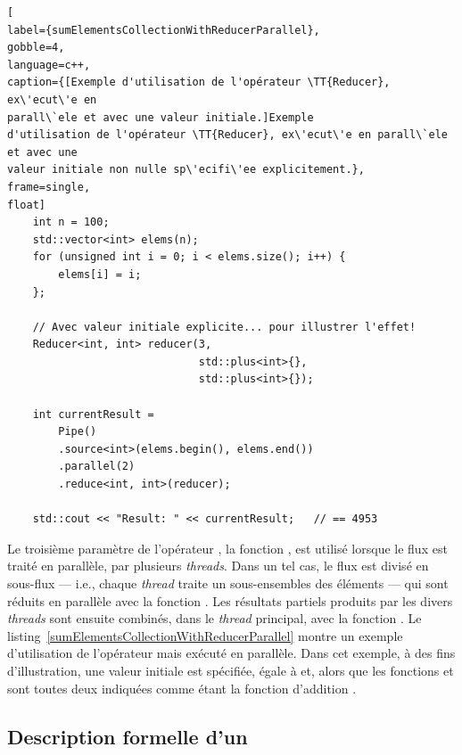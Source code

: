 \begin{lstlisting}[
label={sumElementsCollectionWithReducerParallel},
gobble=4,
language=c++,
caption={[Exemple d'utilisation de l'opérateur \TT{Reducer}, ex\'ecut\'e en
parall\`ele et avec une valeur initiale.]Exemple
d'utilisation de l'opérateur \TT{Reducer}, ex\'ecut\'e en parall\`ele et avec une
valeur initiale non nulle sp\'ecifi\'ee explicitement.},
frame=single,
float]
    int n = 100;
    std::vector<int> elems(n);
    for (unsigned int i = 0; i < elems.size(); i++) {
        elems[i] = i;
    };

    // Avec valeur initiale explicite... pour illustrer l'effet!
    Reducer<int, int> reducer(3, 
                              std::plus<int>{}, 
                              std::plus<int>{});

	int currentResult =
		Pipe()
		.source<int>(elems.begin(), elems.end())
		.parallel(2)
		.reduce<int, int>(reducer); 
	
	std::cout << "Result: " << currentResult;	// == 4953
\end{lstlisting}




Le troisi\`eme param\`etre de l'op\'erateur , la fonction , est utilis\'e lorsque le flux est trait\'e en parall\`ele, par plusieurs \emph{threads}. Dans un tel cas, le flux est divis\'e en sous-flux --- i.e., chaque \emph{thread} traite un sous-ensembles des éléments --- qui sont r\'eduits en parall\`ele avec la fonction . Les r\'esultats partiels produits par les divers \emph{threads} sont ensuite combin\'es, dans le \emph{thread} principal, avec la fonction . Le listing~\ref{sumElementsCollectionWithReducerParallel} montre un exemple d'utilisation de l'op\'erateur  mais ex\'ecut\'e en parall\`ele. Dans cet exemple, \`a des fins d'illustration, une valeur initiale est sp\'ecifi\'ee, \'egale \`a  et, alors que les fonctions  et  sont toutes deux indiqu\'ees comme \'etant la fonction d'addition . 





\newpage

\subsection*{Description formelle d'un }

